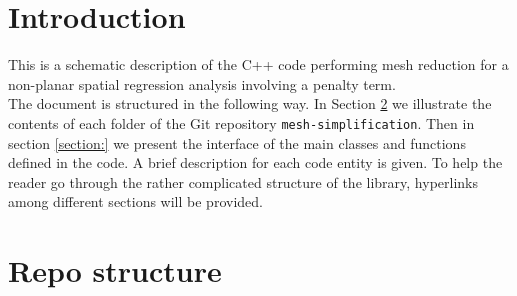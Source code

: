\documentclass[11pt,a4paper]{article}
\theoremstyle{definition}
\theoremstyle{theorem}
\numberwithin{equation}{section}
\numberwithin{figure}{section}
\begin{document}
	\section{Introduction}

		This is a schematic description of the C++ code performing mesh reduction for a non-planar spatial regression analysis involving a penalty term. \\
		The document is structured in the following way. In Section \ref{section:Repo structure} we illustrate the contents of each folder of the Git repository \texttt{mesh-simplification}. Then in section \ref{section:} we present the interface of the main classes and functions defined in the code. A brief description for each code entity is given. To help the reader go through the rather complicated structure of the library, hyperlinks among different sections will be provided.
	
	\section{Repo structure}
	\label{section:Repo structure}
	
\end{document}
